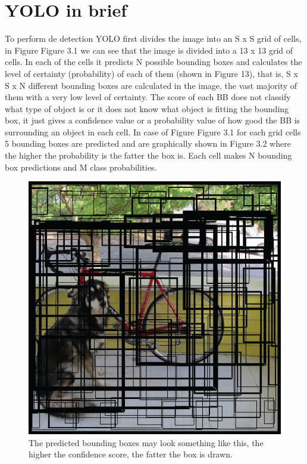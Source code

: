 \section{YOLO in brief}
To perform de detection YOLO first divides the image into an S x S grid of cells, in Figure Figure 3.1 we can see that the image is divided into a 13 x 13 grid of cells. In each of the cells it predicts N possible bounding boxes and calculates the level of certainty (probability) of each of them (shown in Figure 13), that is, S x S x N different bounding boxes are calculated in the image, the vast majority of them with a very low level of certainty. The score of each BB does not classify what type of object is or it does not know what object is fitting the bounding box, it just gives a confidence value or a probability value of how good the BB is surrounding an object in each cell. In case of Figure Figure 3.1 for each grid cells 5 bounding boxes are predicted and are graphically shown in Figure 3.2 where the higher the probability is the fatter the box is. Each cell makes N bounding box predictions and M class probabilities. 

\begin{figure}[h]
    \centering
    \includegraphics[max width=\textwidth]{images/ours/yolo-grid-2.png}
   \caption[The predicted bounding boxes]{ The predicted bounding boxes may look something like this, the higher the confidence score, the fatter the box is drawn. }
    \label{fig:yolo-grid-2}
\end{figure}

